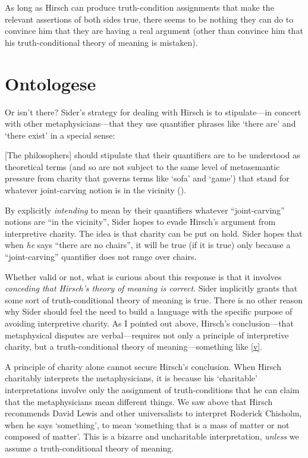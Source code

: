 \documentclass[11pt]{article}
\newenvironment{squote}{%
\begin{spacing}{1}
       	\begin{list}{}{%
\setlength{\labelwidth}{0pt}%
\rightmargin\leftmargin%
}
\item\relax
}{%
\end{list}%
\end{spacing}
}
\begin{document}
\begin{spacing}{1.25}
As long as Hirsch can produce truth-condition assignments that make
the relevant assertions of both sides true, there seems to be nothing
they can do to convince him that they are having a real argument
(other than convince him that his truth-conditional theory of meaning
is mistaken).

\section{Ontologese}
\label{ontologese}
Or isn't there?  Sider's strategy for dealing with Hirsch is to
stipulate---in concert with other metaphysicians---that they use
quantifier phrases like `there are' and `there exist' in a special
sense:

\begin{squote}
{[}The philosophers{]} should stipulate that their quantifiers are to be
understood as theoretical terms (and so are not subject to the same
level of metasemantic pressure from charity that governs terms like
`sofa' and `game') that stand for whatever joint-carving notion is in
the vicinity (\citeyear[9]{sider2011b}).
\end{squote}

By explicitly \emph{intending} to mean by their quantifiers whatever
``joint-carving'' notions are ``in the vicinity'', Sider hopes to
evade Hirsch's argument from interpretive charity.  The idea is that
charity can be put on hold.  Sider hopes that when {\em he} says
``there are no chairs'', it will be true (if it is true) only because
a ``joint-carving'' quantifier does not range over chairs.

Whether valid or not, what is curious about this response is that it
involves {\em conceding that Hirsch's theory of meaning is correct}.
Sider implicitly grants that some sort of truth-conditional theory of
meaning is true.  There is no other reason why Sider should feel the
need to build a language with the specific purpose of avoiding
interpretive charity.  As I pointed out above, Hirsch's
conclusion---that metaphysical disputes are verbal---requires not only
a principle of interpretive charity, but a truth-conditional theory of
meaning---something like \ref{v}.

A principle of charity alone cannot secure Hirsch's conclusion.  When
Hirsch charitably interprets the metaphysicians, it is because his
`charitable' interpretations involve only the assignment of
truth-conditions that he can claim that the metaphysicians mean
different things.  We saw above that Hirsch recommends David Lewis and
other universalists to interpret Roderick Chisholm, when he says
`something', to mean `something that is a mass of matter or not
composed of matter'.  This is a bizarre and uncharitable
interpretation, {\em unless} we assume a truth-conditional theory of
meaning.


\end{spacing}
\end{document}
